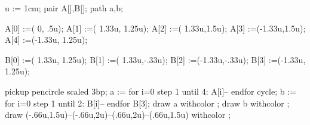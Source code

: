 u := 1cm;
pair A[],B[];
path a,b;

A[0] :=(     0, .5u);
A[1] :=( 1.33u, 1.25u);
A[2] :=( 1.33u,1.5u);
A[3] :=(-1.33u,1.5u);
A[4] :=(-1.33u, 1.25u);

B[0] :=( 1.33u, 1.25u);
B[1] :=( 1.33u,-.33u);
B[2] :=(-1.33u,-.33u);
B[3] :=(-1.33u, 1.25u);

pickup pencircle scaled 3bp;
a := for i=0 step 1 until 4:
	A[i]--
endfor cycle;
b := for i=0 step 1 until 2:
	B[i]--
endfor B[3];
draw a withcolor ;
draw b withcolor ;
draw (-.66u,1.5u)--(-.66u,2u)--(.66u,2u)--(.66u,1.5u) withcolor ;
\stopreusableMPgraphic

\stopenvironment
